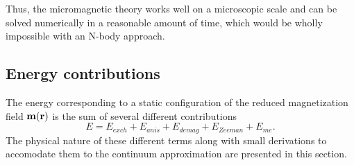 \documentclass[11pt,a4paper,english]{article}
\begin{document}
Thus, the micromagnetic theory works well on a microscopic scale and can be solved numerically in a reasonable amount of time, which would be wholly impossible with an N-body approach.

\subsection{Energy contributions}
The energy corresponding to a static configuration of the reduced magnetization field $\vb{m}(\vb{r})$ is the sum of several different contributions
\begin{equation}
    E = E_{exch} + E_{anis} + E_{demag} + E_{Zeeman} + E_{me} \mathrm{.} \label{eq:Energy_Terms}
\end{equation}
The physical nature of these different terms along with small derivations to accomodate them to the continuum approximation are presented in this section.
\end{document}
